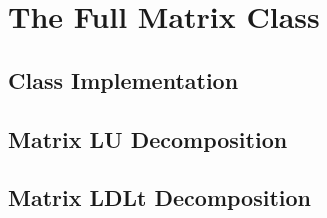 \section{The Full Matrix Class}\label{sec:fullmatrix}

\subsection{Class Implementation} \label{sec:fullmatrix_implementation}

\subsection{Matrix LU Decomposition} \label{sec:lu}

\subsection{Matrix LDLt Decomposition} \label{sec:ldlt}